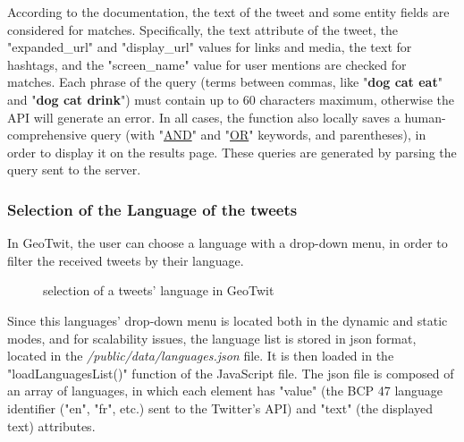 \documentclass[a4paper,11pt]{report}
\begin{document}
According to the documentation, the text of the tweet and some entity fields are considered for matches. Specifically, the text attribute of the tweet, the "expanded\_url" and "display\_url" values for links and media, the text for hashtags, and the "screen\_name" value for user mentions are checked for matches. Each phrase of the query (terms between commas, like "\textbf{dog cat eat}" and "\textbf{dog cat drink}") must contain up to 60 characters maximum, otherwise the API will generate an error.
In all cases, the function also locally saves a human-comprehensive query (with "\underline{AND}" and "\underline{OR}" keywords, and parentheses), in order to display it on the results page. These queries are generated by parsing the query sent to the server.
\newpage

\subsubsection{Selection of the Language of the tweets}
In GeoTwit, the user can choose a language with a drop-down menu, in order to filter the received tweets by their language.
\begin{figure}[H]
\vspace{-5pt}
\begin{center}
\vspace{-20pt}
\caption{selection of a tweets' language in GeoTwit}
\end{center}
\end{figure}

Since this languages' drop-down menu is located both in the dynamic and static modes, and for scalability issues, the language list is stored in json format, located in the \emph{/public/data/languages.json} file. It is then loaded in the "loadLanguagesList()" function of the JavaScript file. The json file is composed of an array of languages, in which each element has "value" (the BCP 47 language identifier ("en", "fr", etc.) sent to the Twitter's API) and "text" (the displayed text) attributes.
\newpage
\end{document}
